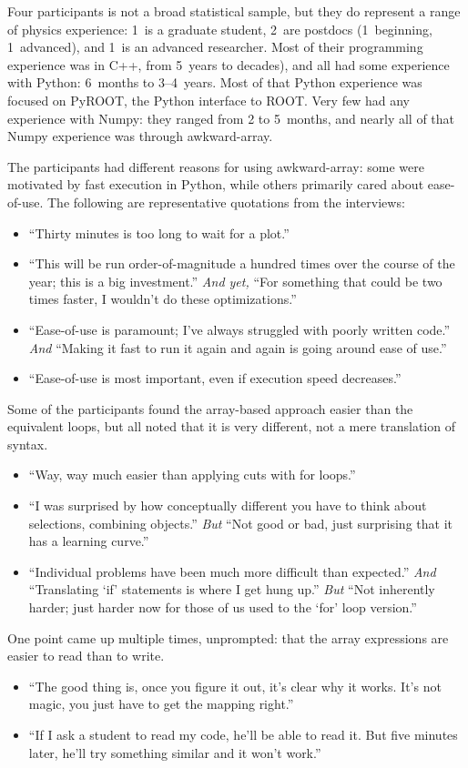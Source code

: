 \documentclass[a4paper]{jpconf}
\begin{document}
Four participants is not a broad statistical sample, but they do represent a range of physics experience: 1~is a graduate student, 2~are postdocs (1~beginning, 1~advanced), and 1~is an advanced researcher. Most of their programming experience was in C++, from 5~years to decades), and all had some experience with Python: 6~months to 3--4~years. Most of that Python experience was focused on PyROOT, the Python interface to ROOT. Very few had any experience with Numpy: they ranged from 2 to 5~months, and nearly all of that Numpy experience was through awkward-array.

The participants had different reasons for using awkward-array: some were motivated by fast execution in Python, while others primarily cared about ease-of-use. The following are representative quotations from the interviews:
\begin{itemize}
\item ``Thirty minutes is too long to wait for a plot.''
\item ``This will be run order-of-magnitude a hundred times over the course of the year; this is a big investment.'' {\it And yet,} ``For something that could be two times faster, I wouldn't do these optimizations.''
\item ``Ease-of-use is paramount; I've always struggled with poorly written code.'' {\it And} ``Making it fast to run it again and again is going around ease of use.''
\item ``Ease-of-use is most important, even if execution speed decreases.''
\end{itemize}

Some of the participants found the array-based approach easier than the equivalent loops, but all noted that it is very different, not a mere translation of syntax.
\begin{itemize}
\item ``Way, way much easier than applying cuts with for loops.''
\item ``I was surprised by how conceptually different you have to think about selections, combining objects.'' {\it But} ``Not good or bad, just surprising that it has a learning curve.''
\item ``Individual problems have been much more difficult than expected.'' {\it And} ``Translating `if' statements is where I get hung up.'' {\it But} ``Not inherently harder; just harder now for those of us used to the `for' loop version.''
\end{itemize}

One point came up multiple times, unprompted: that the array expressions are easier to read than to write.
\begin{itemize}
\item ``The good thing is, once you figure it out, it's clear why it works. It's not magic, you just have to get the mapping right.''
\item ``If I ask a student to read my code, he'll be able to read it. But five minutes later, he'll try something similar and it won't work.''
\end{itemize}
\end{document}
